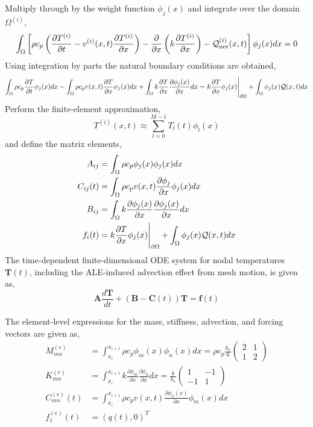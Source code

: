 Multiply through by the weight function $\phi_j(x)$ and integrate over the domain $\Omega^{(i)}$,
\begin{equation}
    \int_{\Omega}\left[\rho c_p\left(\frac{\partial T^{(i)}}{\partial t} - v^{(i)}(x,t)\frac{\partial T^{(i)}}{\partial x}\right) - \frac{\partial}{\partial x}\left(k\frac{\partial T^{(i)}}{\partial x}\right) - \mathcal{Q}^{(i)}_{\text{net}}(x,t)\right]\phi_j(x)dx = 0
\end{equation}
Using integration by parts the natural boundary conditions are obtained,
\begin{equation}
    \int_{\Omega}\rho c_p\frac{\partial T}{\partial t}\phi_j(x)dx - \int_{\Omega}\rho c_p v(x,t)\frac{\partial T}{\partial x}\phi_j(x)dx + \int_{\Omega} k\frac{\partial T}{\partial x}\frac{\partial\phi_j(x)}{\partial x} dx = k\frac{\partial T}{\partial x}\phi_j(x)\Bigg|_{\partial\Omega} + \int_{\Omega}\phi_j(x)\mathcal{Q}(x,t)dx
\end{equation}
Perform the finite-element approximation,
\begin{equation}
    T^{(i)}(x,t)\approx\sum_{l=0}^{M-1} T_l(t)\phi_l(x)
\end{equation}
and define the matrix elements,
\begin{align}
    A_{ij} &= \int_{\Omega}\rho c_p\phi_j(x)\phi_j(x)dx\\
    C_{ij}(t) &= \int_{\Omega}\rho c_p v(x,t) \frac{\partial\phi_j}{\partial x}\phi_j(x)dx\\
    B_{ij} &= \int_{\Omega}k\frac{\partial\phi_j(x)}{\partial x}\frac{\partial\phi_j(x)}{\partial x}dx\\
    f_i(t) &= k\frac{\partial T}{\partial x}\phi_j(x)\Bigg|_{\partial\Omega} + \int_{\Omega}\phi_j(x)\mathcal{Q}(x,t)dx
\end{align}
The time-dependent finite-dimensional ODE system for nodal temperatures $\mathbf{T}(t)$, including the ALE-induced advection effect from mesh motion, is given as,
\begin{equation}
    \mathbf{A}\frac{d\mathbf{T}}{dt} + \left(\mathbf{B} - \mathbf{C}(t)\right)\mathbf{T} = \mathbf{f}(t)
\end{equation}

The element-level expressions for the mass, stiffness, advection, and forcing vectors are given as,
\begin{align}
    M^{(e)}_{mn} &= \int_{x_i}^{x_{i+1}}\rho c_p\phi_m(x)\phi_n(x)dx = \rho c_p \frac{h_e}{6}\begin{pmatrix}
        2 & 1 \\ 1 & 2
    \end{pmatrix}\\
    K^{(e)}_{mn} &= \int_{x_i}^{x_{i+1}} k \frac{\partial \phi_m}{\partial x}\frac{\partial \phi_n}{\partial x} dx = \frac{k}{h_e}\begin{pmatrix}
        1 & -1 \\ -1 & 1
    \end{pmatrix}\\
    C^{(e)}_{mn}(t) &= \int_{x_i}^{x_{i+1}}\rho c_p v(x,t) \frac{\partial \phi_n(x)}{\partial x}\phi_m(x) dx\\
    f^{(e)}_1(t) &= \left(q(t),0\right)^T
\end{align}



